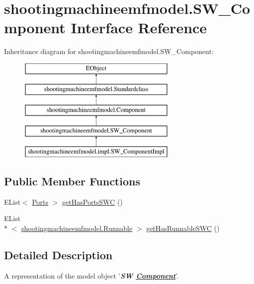\hypertarget{interfaceshootingmachineemfmodel_1_1_s_w___component}{\section{shootingmachineemfmodel.\-S\-W\-\_\-\-Component Interface Reference}
\label{interfaceshootingmachineemfmodel_1_1_s_w___component}
}
Inheritance diagram for shootingmachineemfmodel.\-S\-W\-\_\-\-Component\-:\begin{figure}[H]
\begin{center}
\leavevmode
\includegraphics[height=5.000000cm]{interfaceshootingmachineemfmodel_1_1_s_w___component}
\end{center}
\end{figure}
\subsection*{Public Member Functions}
\begin{DoxyCompactItemize}
\item 
E\-List$<$ \hyperlink{interfaceshootingmachineemfmodel_1_1_ports}{Ports} $>$ \hyperlink{interfaceshootingmachineemfmodel_1_1_s_w___component_a5f5305fa3eaa1aff6b5f251140381887}{get\-Has\-Ports\-S\-W\-C} ()
\item 
E\-List\\*
$<$ \hyperlink{interfaceshootingmachineemfmodel_1_1_runnable}{shootingmachineemfmodel.\-Runnable} $>$ \hyperlink{interfaceshootingmachineemfmodel_1_1_s_w___component_a48fba8171e471bec62c19b27b38c5a98}{get\-Has\-Runnable\-S\-W\-C} ()
\end{DoxyCompactItemize}


\subsection{Detailed Description}
A representation of the model object '{\itshape {\bfseries S\-W \hyperlink{interfaceshootingmachineemfmodel_1_1_component}{Component}}}'.

